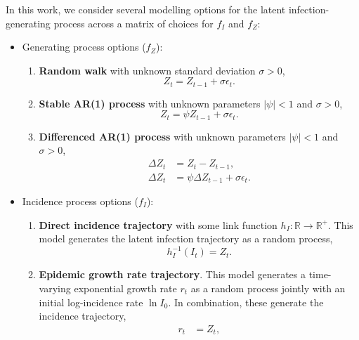 \documentclass{getwriting}
\begin{document}
In this work, we consider several modelling options for the latent infection-generating process across a matrix of choices for $f_I$ and $f_Z$:

\begin{itemize}
    \item Generating process options ($f_Z$):
    \begin{enumerate}
        \item \textbf{Random walk} with unknown standard deviation $\sigma >0 $, 
            \begin{equation}
                Z_t = Z_{t-1} + \sigma \epsilon_t.
            \end{equation}
        \item \textbf{Stable AR(1) process} with unknown parameters $|\psi| < 1 $ and $\sigma > 0$,
        \begin{equation}
            Z_t = \psi Z_{t-1} + \sigma \epsilon_t.
        \end{equation}
        \item \textbf{Differenced AR(1) process} with unknown parameters $|\psi| < 1 $ and $\sigma > 0$,
        \begin{equation}
            \begin{split}
                \Delta Z_{t} &= Z_{t} - Z_{t-1}, \\
                \Delta Z_t &= \psi \Delta Z_{t-1} + \sigma \epsilon_t.
            \end{split}
        \end{equation}
    \end{enumerate}
    \item Incidence process options ($f_I$):
    \begin{enumerate}
        \item \textbf{Direct incidence trajectory} with some link function $h_I: \mathbb{R} \to \mathbb{R}^{+}$. This model generates the latent infection trajectory as a random process,
        \begin{equation}
            h^{-1}_I(I_t) = Z_t.
        \end{equation}
	\item \textbf{Epidemic growth rate trajectory}. This model generates a time-varying exponential growth rate $r_t$ as a random process jointly with an initial log-incidence rate $\ln I_0$. In combination, these generate the incidence trajectory,
         \begin{equation}
             \begin{split}
                 r_t & = Z_t, \\

\end{split}
\end{equation}
\end{enumerate}
\end{itemize}
\end{document}
